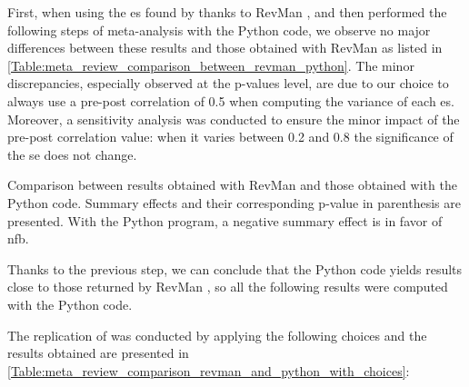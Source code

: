 First, when using the \gls{es} found by \citet{Cortese2016} thanks to RevMan \citep{RevMan}, and then performed the following steps 
of meta-analysis with the Python code, we observe no major differences between these results and those obtained with RevMan \citep{RevMan} 
as listed in \cref{Table:meta_review_comparison_between_revman_python}. The minor discrepancies, especially observed at the p-values level,
 are due to our choice to always use a pre-post correlation of 0.5 when computing the variance of each \gls{es}. Moreover, a sensitivity 
analysis was conducted to ensure the minor impact of the pre-post correlation value: when it varies between 0.2 and 0.8 the significance 
of the \gls{se} does not change. 

\begin{table}[h!]
  \centering
  \caption{Comparison between \citet{Cortese2016} results obtained with RevMan \citep{RevMan} and those obtained with the Python code. Summary 
	effects and their corresponding p-value in parenthesis are presented. With the Python program, a negative summary effect is in favor of \gls{nfb}.}

  \label{Table:meta_review_comparison_between_revman_python}
\end{table}

Thanks to the previous step, we can conclude that the Python code yields results close to those returned by RevMan \citet{RevMan}, so all 
the following results were computed with the Python code. 

The replication of \citet{Cortese2016} was conducted by applying the following choices and the results obtained are presented 
in \cref{Table:meta_review_comparison_revman_and_python_with_choices}:

